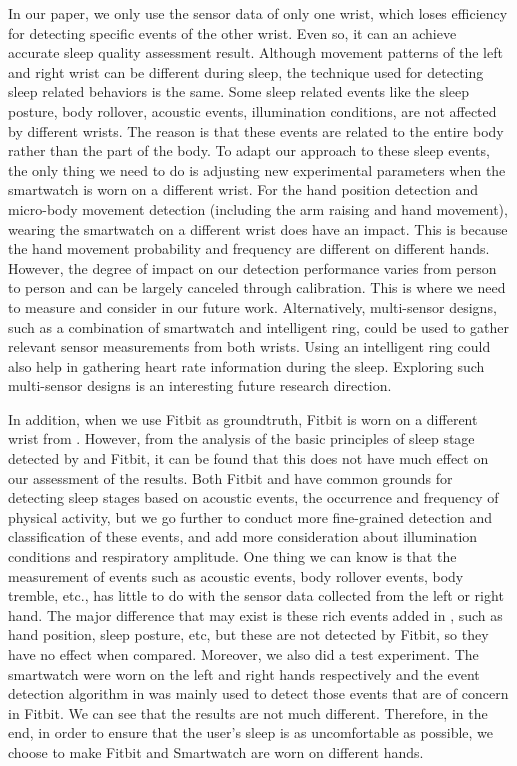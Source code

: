  In our paper, we only use the sensor data of only one wrist, which loses efficiency for detecting
specific events of the other wrist. Even so, it can an achieve accurate sleep quality assessment result. Although movement patterns of the
left and right wrist can be different during sleep, the technique used for detecting sleep related behaviors is the same. Some sleep
related events like the sleep posture, body rollover, acoustic events, illumination conditions, are not affected by different wrists. The
reason is that these events are related to the entire body rather than the part of the body. To adapt our approach to these sleep events,
the only thing we need to do is adjusting new experimental parameters when the smartwatch is worn on a different wrist. For the hand
position detection and micro-body movement detection (including the arm 	raising and hand movement), wearing the smartwatch on a
different wrist does have an impact. This is because the hand movement probability and frequency are different on different hands. However,
the degree of impact on our detection performance varies from person to person and can be largely canceled through calibration. This is
where we need to measure and consider in our future work. Alternatively, multi-sensor designs, such as a combination of smartwatch and
intelligent ring, could be used to gather relevant sensor measurements from both wrists. Using an intelligent ring could also help in
gathering heart rate information during the sleep. Exploring such multi-sensor designs is an interesting future research direction.

 In addition, when we use Fitbit as groundtruth, Fitbit is worn on a different wrist from {\systemname}.
However, from the analysis of the basic principles of sleep stage detected by {\systemname} and Fitbit, it can be found that this does not
have much effect on our assessment of the results. Both Fitbit and {\systemname} have common grounds for detecting sleep stages based on
acoustic events, the occurrence and frequency of physical activity, but we go further to conduct more fine-grained detection and
classification of these events, and add more consideration about illumination conditions and respiratory amplitude. One thing we can know
is that the measurement of events such as acoustic events, body rollover events, body tremble, etc., has little to do with the sensor data
collected from the left or right hand. The major difference that may exist is these rich events added in {\systemname}, such as hand
position, sleep posture, etc,  but these are not detected by Fitbit, so they have no effect when compared. Moreover, we also did a test
experiment. The smartwatch were worn on the left and right hands respectively and the event detection algorithm in {\systemname} was mainly
used to detect those events that are of concern in Fitbit. We can see that the results are not much different. Therefore, in the end, in
order to ensure that the user's sleep is as uncomfortable as possible, we choose to make Fitbit and Smartwatch are worn on different hands.



